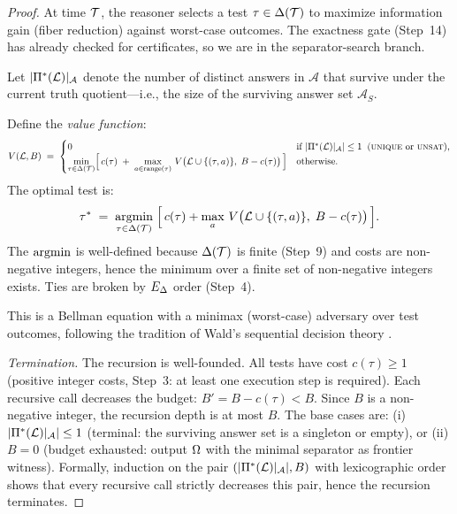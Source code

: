 \begin{proof}
At time $\mathcal{T}$, the reasoner selects a test $\tau \in \Delta(\mathcal{T})$ to
maximize information gain (fiber reduction) against worst-case outcomes.
The exactness gate (Step~14) has already checked for certificates, so
we are in the separator-search branch.

Let $|\Pi^*(\mathcal{L})|_{\mathcal{A}}$ denote the number of distinct answers
in $\mathcal{A}$ that survive under the current truth quotient---i.e., the
size of the surviving answer set $\mathcal{A}_S$.

Define the \emph{value function}:
\[
  V(\mathcal{L}, B) \;=\;
  \begin{cases}
    0 & \text{if } |\Pi^*(\mathcal{L})|_{\mathcal{A}}| \leq 1
      \;\;(\textsc{unique} \text{ or } \textsc{unsat}), \\
    \displaystyle\min_{\tau \in \Delta(\mathcal{T})} \Bigl[\,
      c(\tau) \;+\; \max_{a \in \mathrm{range}(\tau)}\,
      V\bigl(\mathcal{L} \cup \{(\tau, a)\},\; B - c(\tau)\bigr)
    \,\Bigr]
    & \text{otherwise}.
  \end{cases}
\]
The optimal test is:
\[
  \tau^* \;=\; \argmin_{\tau \in \Del(\Tim)}\;
  \Bigl[\, c(\tau) + \max_{a}\, V\bigl(\Ledger \cup \{(\tau,a)\},\;
    B - c(\tau)\bigr) \,\Bigr].
\]
The $\argmin$ is well-defined because $\Delta(\mathcal{T})$ is finite (Step~9) and
costs are non-negative integers, hence the minimum over a finite set of
non-negative integers exists.  Ties are broken by $E_\Delta$ order
(Step~4).

This is a Bellman equation \citep{bellman1957} with a minimax (worst-case)
adversary over test outcomes, following the tradition of Wald's sequential
decision theory \citep{wald1950}.

\emph{Termination.}  The recursion is well-founded.  All tests have
cost $c(\tau) \geq 1$ (positive integer costs, Step~3: at least one
execution step is required).  Each recursive call decreases the budget:
$B' = B - c(\tau) < B$.  Since $B$ is a non-negative integer, the
recursion depth is at most $B$.  The base cases are: (i)
$|\Pi^*(\mathcal{L})|_{\mathcal{A}}| \leq 1$ (terminal: the surviving answer
set is a singleton or empty), or (ii) $B = 0$ (budget exhausted: output
$\Omega$ with the minimal separator as frontier witness).  Formally,
induction on the pair $(|\Pi^*(\mathcal{L})|_{\mathcal{A}}|, B)$ with
lexicographic order shows that every recursive call strictly decreases
this pair, hence the recursion terminates.


\end{proof}
